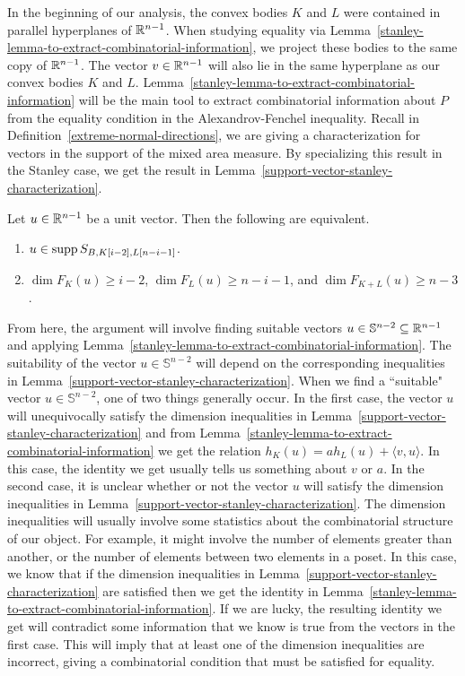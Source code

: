 \documentclass{puthesis-UG}
\begin{document}
In the beginning of our analysis, the convex bodies $K$ and $L$ were contained in parallel hyperplanes of $\mathbb{R}^{n-1}$. When studying equality via Lemma~\ref{stanley-lemma-to-extract-combinatorial-information}, we project these bodies to the same copy of $\mathbb{R}^{n-1}$. The vector $v \in \mathbb{R}^{n-1}$ will also lie in the same hyperplane as our convex bodies $K$ and $L$. Lemma~\ref{stanley-lemma-to-extract-combinatorial-information} will be the main tool to extract combinatorial information about $P$ from the equality condition in the Alexandrov-Fenchel inequality. Recall in Definition~\ref{extreme-normal-directions}, we are giving a characterization for vectors in the support of the mixed area measure. By specializing this result in the Stanley case, we get the result in Lemma~\ref{support-vector-stanley-characterization}. 

\begin{lem} \label{support-vector-stanley-characterization}
	Let $u \in \mathbb{R}^{n-1}$ be a unit vector. Then the following are equivalent. 
	\begin{enumerate}[label = (\alph*)]
		\item $u \in \operatorname{supp} S_{B, K[i-2], L[n-i-1]}$.

		\item $\dim F_K(u) \geq i-2$, $\dim F_L(u) \geq n-i-1$, and $\dim F_{K+L}(u) \geq n-3$. 
	\end{enumerate}
\end{lem}

From here, the argument will involve finding suitable vectors $u \in \mathbb{S}^{n-2} \subseteq \mathbb{R}^{n-1}$ and applying Lemma~\ref{stanley-lemma-to-extract-combinatorial-information}. The suitability of the vector $u \in \mathbb{S}^{n-2}$ will depend on the corresponding inequalities in Lemma~\ref{support-vector-stanley-characterization}. When we find a ``suitable" vector $u \in \mathbb{S}^{n-2}$, one of two things generally occur. In the first case, the vector $u$ will unequivocally satisfy the dimension inequalities in Lemma~\ref{support-vector-stanley-characterization} and from Lemma~\ref{stanley-lemma-to-extract-combinatorial-information} we get the relation $h_K(u) = a h_L(u) + \langle v, u \rangle$. In this case, the identity we get usually tells us something about $v$ or $a$. In the second case, it is unclear whether or not the vector $u$ will satisfy the dimension inequalities in Lemma~\ref{support-vector-stanley-characterization}. The dimension inequalities will usually involve some statistics about the combinatorial structure of our object. For example, it might involve the number of elements greater than another, or the number of elements between two elements in a poset. In this case, we know that if the dimension inequalities in Lemma~\ref{support-vector-stanley-characterization} are satisfied then we get the identity in Lemma~\ref{stanley-lemma-to-extract-combinatorial-information}. If we are lucky, the resulting identity we get will contradict some information that we know is true from the vectors in the first case. This will imply that at least one of the dimension inequalities are incorrect, giving a combinatorial condition that must be satisfied for equality. \\
\end{document}
